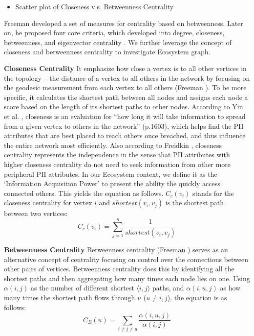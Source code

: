 \documentclass[conference]{IEEEtran}
\begin{document}
\begin{itemize}
\item Scatter plot of Closeness v.s. Betweenness Centrality
\end{itemize}

Freeman \cite{Freeman78centralityin} developed a set of measures for centrality based on betweenness. Later on, he proposed four core criteria, which developed into degree, closeness, betweenness, and eigenvector centrality  \cite{Freeman79centralityin}. We further leverage the concept of closeness and betweenness centrality to investigate Ecosystem graph.

\textbf{Closeness Centrality}
 It emphasize how close a vertex is to all other vertices in the topology -- the distance of a vertex to all others in the network by focusing on the geodesic measurement from each vertex to all others (Freeman \cite{Freeman79centralityin}). To be more specific, it calculates the shortest path between all nodes and assigns each node a score based on the length of its shortest paths to other nodes. According to Yin et al. \cite{Yin2006}, closeness is an evaluation for ``how long it will take information to spread from a given vertex to others in the network'' (p.1603), which helps find the PII attributes that are best placed to reach others once breached, and thus influence the entire network most efficiently. Also according to Freidkin \cite{Freidkin}, closeness centrality represents the independence in the sense that PII attributes with higher closeness centrality do not need to seek information from other more peripheral PII attributes. In our Ecosystem context, we define it as the `Information Acquisition Power' to present the ability the quickly access connected others.
This yields the equation as follows. $C_{c}(v_{i})$ stands for the closeness centrality for vertex $i$ and $shortest(v_{i},v_{j})$ is the shortest path between two vertices:
\begin{equation}
C_{c}(v_{i}) = \sum_{j = 1}^{n} \frac{1}{shortest(v_{i}, v_{j})}
\label{closeness_centrality_equation}
\end{equation}

\textbf{Betweenness Centrality}
Betweenness centrality (Freeman \cite{Freeman79centralityin}) serves as an alternative concept of centrality focusing on control over the connections between other pairs of vertices. Betweenness centrality does this by identifying all the shortest paths and then aggregating how many times each node lies on one. Using $\alpha (i, j)$ as the number of different shortest $\langle i, j \rangle$ paths, and  $\alpha (i, u, j)$ as how many times the shortest path flows through $u$ ($ u \neq i, j$), the equation is as follows:
\begin{equation}
C_{B}(u) = \sum_{i \neq j \neq u}^{} \frac{\alpha (i, u, j) }{\alpha (i, j)}
\label{betweenness_centrality}
\end{equation}
\end{document}

